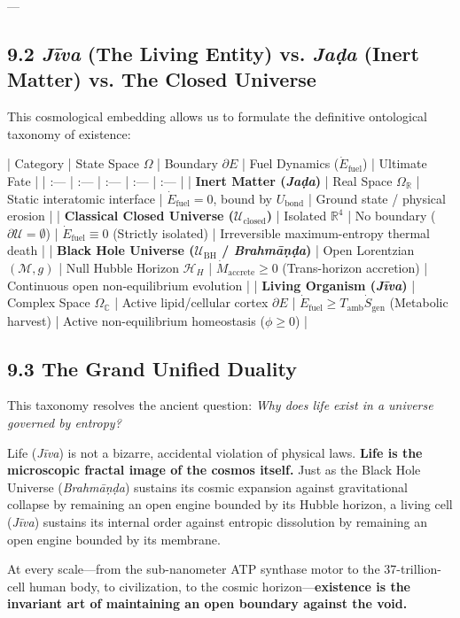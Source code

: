 \documentclass[11pt,a4paper]{article}
\theoremstyle{definition}
\theoremstyle{remark}
\begin{document}
---

\subsection{9.2 \textit{Jīva} (The Living Entity) vs. \textit{Jaḍa} (Inert Matter) vs. The Closed Universe}
This cosmological embedding allows us to formulate the definitive ontological taxonomy of existence:

| Category | State Space $\Omega$ | Boundary $\partial E$ | Fuel Dynamics ($\dot{E}_{\text{fuel}}$) | Ultimate Fate |
| :--- | :--- | :--- | :--- | :--- |
| \textbf{Inert Matter (\textit{Jaḍa})} | Real Space $\Omega_{\mathbb{R}}$ | Static interatomic interface | $\dot{E}_{\text{fuel}} = 0$, bound by $U_{\text{bond}}$ | Ground state / physical erosion |
| \textbf{Classical Closed Universe ($\mathcal{U}_{\text{closed}}$)} | Isolated $\mathbb{R}^4$ | No boundary ($\partial \mathcal{U} = \emptyset$) | $\dot{E}_{\text{fuel}} \equiv 0$ (Strictly isolated) | Irreversible maximum-entropy thermal death |
| \textbf{Black Hole Universe ($\mathcal{U}_{\text{BH}}$ / \textit{Brahmāṇḍa})} | Open Lorentzian $(\mathcal{M}, g)$ | Null Hubble Horizon $\mathcal{H}_H$ | $\dot{M}_{\text{accrete}} \ge 0$ (Trans-horizon accretion) | Continuous open non-equilibrium evolution |
| \textbf{Living Organism (\textit{Jīva})} | Complex Space $\Omega_{\mathbb{C}}$ | Active lipid/cellular cortex $\partial E$ | $\dot{E}_{\text{fuel}} \ge T_{\text{amb}}\dot{S}_{\text{gen}}$ (Metabolic harvest) | Active non-equilibrium homeostasis ($\phi \ge 0$) |

\subsection{9.3 The Grand Unified Duality}
This taxonomy resolves the ancient question: \textit{Why does life exist in a universe governed by entropy?}

Life (\textit{Jīva}) is not a bizarre, accidental violation of physical laws. \textbf{Life is the microscopic fractal image of the cosmos itself.} Just as the Black Hole Universe (\textit{Brahmāṇḍa}) sustains its cosmic expansion against gravitational collapse by remaining an open engine bounded by its Hubble horizon, a living cell (\textit{Jīva}) sustains its internal order against entropic dissolution by remaining an open engine bounded by its membrane.

At every scale—from the sub-nanometer ATP synthase motor to the 37-trillion-cell human body, to civilization, to the cosmic horizon—\textbf{existence is the invariant art of maintaining an open boundary against the void.}
\end{document}
